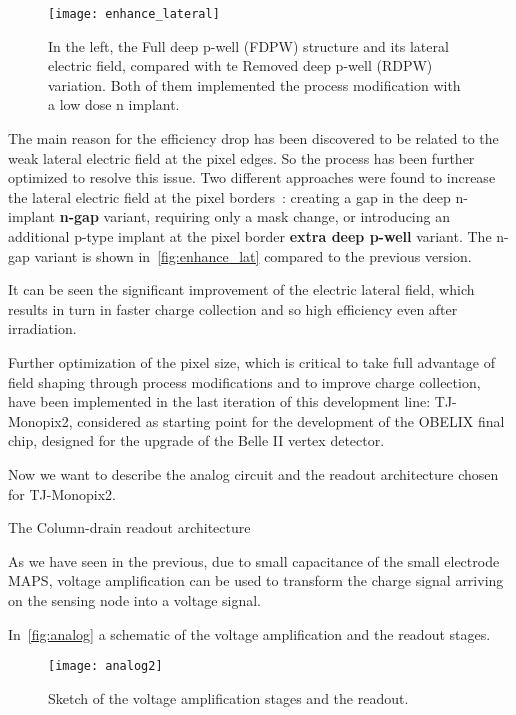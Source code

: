 \begin{figure}[h!]
\centering
\texttt{[image: enhance\_lateral]}
\caption{In the left, the Full deep p-well (FDPW) structure and its lateral electric field, compared with te Removed deep p-well (RDPW) variation. Both of them implemented the process modification with a low dose n implant.}
\label{fig:enhance_lat}
\end{figure}


The main reason for the efficiency drop has been discovered to be related to the weak lateral electric field at the pixel edges. So the process has been further optimized to resolve this issue. Two different approaches were found to increase the lateral electric field at the pixel borders~\cite{Munker_2019}: creating a gap in the deep n-implant \textbf{n-gap} variant, requiring only a mask change, or introducing an additional p-type implant at the pixel border \textbf{extra deep p-well} variant. The n-gap variant is shown in~\autoref{fig:enhance_lat} compared to the previous version.

It can be seen the significant improvement of the electric lateral field, which results in turn in faster charge collection and so high efficiency even after irradiation. 

Further optimization of the pixel size, which is critical to take full advantage of field shaping through process modifications and to improve charge collection, have been implemented in the last iteration of this development line: TJ-Monopix2, considered as starting point for the development of the OBELIX final chip, designed for the upgrade of the Belle II vertex detector.  

Now we want to describe the analog circuit and the readout architecture chosen for TJ-Monopix2. 


\begin{description}
\item[The Column-drain readout architecture]
\end{description}

As we have seen in the previous, due to small capacitance of the small electrode MAPS, voltage amplification can be used to transform the charge signal arriving on the sensing node into a voltage signal. 

In~\autoref{fig:analog} a schematic of the voltage amplification and the readout stages.

\begin{figure}[h!]
\centering
\texttt{[image: analog2]}
\caption{Sketch of the voltage amplification stages and the readout.}
\label{fig:analog}
\end{figure}

